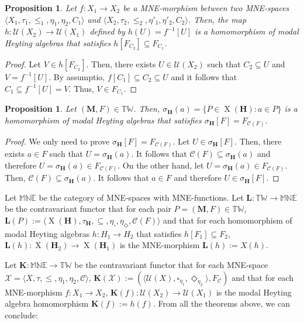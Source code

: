 \documentclass[pdflatex,sn-mathphys-num]{sn-jnl}%
\newcommand{\He}{\mathbf{H}}
\newcommand{\X}[1]{\operatorname{X}(#1)}
\theoremstyle{thmstyleone}%
\newtheorem{proposition}[theorem]{Proposition}%
\theoremstyle{thmstyletwo}%
\theoremstyle{thmstylethree}%
\begin{document}
\begin{proposition}
    Let $f \colon X_1\to X_2$ be a MNE-morphism	between two MNE-spaces $\langle X_1,\tau_1,\leq_1,\eta_1,\eta_2,C_1\rangle$ and $\langle X_2,\tau_2,\leq_2,\eta'_1,\eta'_2,C_2\rangle$. Then, the map $h\colon \mathcal{U}(X_2)\to\mathcal{U}(X_1)$ defined by $h(U)=f^{-1}[U]$ is a homomorphism of modal Heyting algebras that satisfies $h[F_{C_2}]\subseteq F_{C_1}$.
\end{proposition}

\begin{proof}
    Let $V\in h[F_{C_2}]$. Then, there exists $U\in \mathcal{U}(X_2)$ such that $C_2\subseteq U$ and $V=f^{-1}[U]$. By assumptio, $f[C_1]\subseteq C_2\subseteq U$ and it follows that $C_1\subseteq f^{-1}[U]=V$. Thus, $V\in F_{C_1}$.
\end{proof}

\begin{proposition}
    Let $(\mathbf{M},F)\in\mathbb{TW}$. Then, $\sigma_{\He}(a)=\{P\in\X{\He}:a\in P\}$ is a homomorphism of modal Heyting algebras that satisfies $\sigma_\He[F]=F_{\mathcal{C}(F)}$.
\end{proposition}

\begin{proof}
   We only need to prove $\sigma_\He[F]=F_{\mathcal{C}(F)}$. Let $U\in \sigma_\He[F]$. Then, there exists $a\in F$ such that $U=\sigma_\He(a)$. It follows that $\mathcal{C}(F)\subseteq\sigma_\He(a)$ and therefore $U=\sigma_\He(a)\in F_{\mathcal{C}(F)}$.
    On the other hand, let $U=\sigma_\He(a)\in F_{\mathcal{C}(F)}$. Then, $\mathcal{C}(F)\subseteq \sigma_\He(a)$. It follows that $a\in F$ and therefore $U\in \sigma_\He[F]$.
\end{proof}

Let $\mathbb{MNE}$ be the category of MNE-spaces with MNE-functions.
Let $\mathbf{L}\colon \mathbb{TW}\to \mathbb{MNE}$ be the contravariant functor that for each pair $P=(\mathbf{M},F)\in\mathbb{TW}$, $\mathbf{L}(P):=\langle \X{\He},\tau_\He,\subseteq,\eta_\square,\eta_\Diamond,\mathcal{C}(F)\rangle$ and that for each homomorphism of modal Heyting algebras $h\colon H_1\to H_2$ that satisfies $h[F_1]\subseteq F_2$, $\mathbf{L}(h)\colon \X{\He_2}\to\X{\He_1}$ is the MNE-morphism $\mathbf{L}(h):=X(h)$. 

Let $\mathbf{K}\colon \mathbb{MNE}\to \mathbb{TW}$ be the contravariant functor that for each MNE-space $\mathcal{X}=\langle X,\tau,\leq,\eta_1,\eta_2,\mathcal{C}\rangle$, $\mathbf{K}(\mathcal{X}):=(\langle \mathcal{U}(X),\square_{\eta_1},\Diamond_{\eta_2}\rangle,F_\mathcal{C})$ and that for each MNE-morphism $f\colon X_1\to X_2$, $\mathbf{K}(f)\colon \mathcal{U}(X_2)\to \mathcal{U}(X_1)$ is the modal Heyting algebra homomorphism $\mathbf{K}(f):=h(f)$. 
From all the theorems above, we can conclude:
\end{document}
